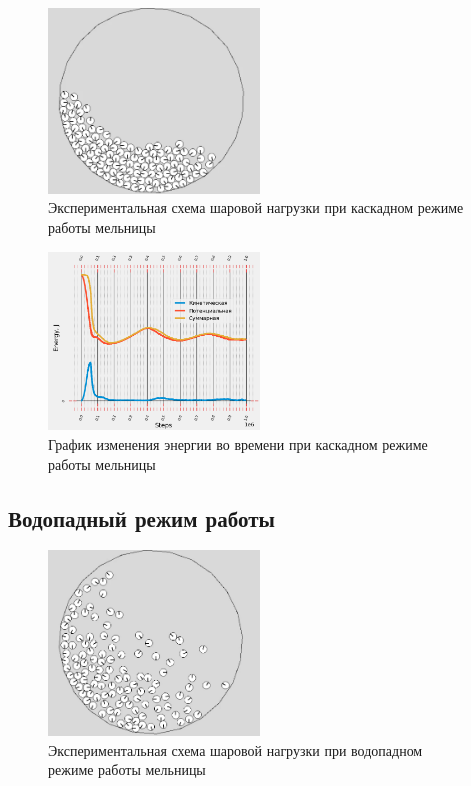 \documentclass[a4paper]{article}
\begin{document}
\begin{figure}[H]
	\centering
	\includegraphics[width=0.5\textwidth]{kaskad_result} 
	\caption{Экспериментальная схема шаровой нагрузки при каскадном режиме работы мельницы}
	\label{pic:kaskad_result}
\end{figure} 

\begin{figure}[H]
	\centering
	\includegraphics[width=0.5\textwidth]{kaskad_energy}
	\caption{График изменения энергии во времени при каскадном режиме работы мельницы}
	\label{pic:kaskad_energy}
\end{figure} 

\subsection{Водопадный режим работы}

\begin{figure}[H]
	\centering
	\includegraphics[width=0.5\textwidth]{vodopad_result} 
	\caption{Экспериментальная схема шаровой нагрузки при водопадном режиме работы мельницы}
	\label{pic:vodopad_result}
\end{figure} 
\end{document}
